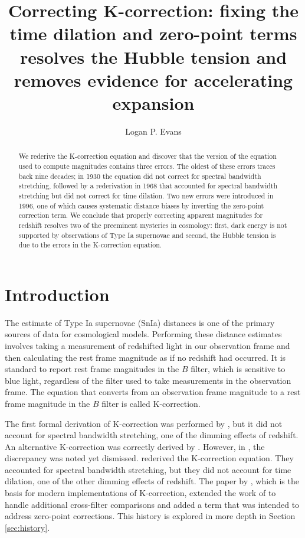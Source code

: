 \documentclass[linenumbers]{aastex631}
\begin{document}
\title{Correcting K-correction: fixing the time dilation and zero-point terms resolves the Hubble tension and removes evidence for accelerating expansion}


\author[0000-0001-6450-3262]{Logan P. Evans}

\begin{abstract}
We rederive the K-correction equation and discover that the version of the
equation used to compute magnitudes contains three errors. The oldest of these
errors traces back nine decades; in 1930 the equation did not correct for
spectral bandwidth stretching, followed by a rederivation in 1968 that
accounted for spectral bandwidth stretching but did not correct for time
dilation. Two new errors were introduced in 1996, one of which causes
systematic distance biases by inverting the zero-point correction term. We
conclude that properly correcting apparent magnitudes for redshift resolves two
of the preeminent mysteries in cosmology: first, dark energy is not supported
by observations of Type Ia supernovae and second, the Hubble tension is due to
the errors in the K-correction equation.
\end{abstract}


\section{Introduction}

The estimate of Type Ia supernovae (SnIa) distances is one of the primary
sources of data for cosmological models. Performing these distance estimates
involves taking a measurement of redshifted light in our observation frame and
then calculating the rest frame magnitude as if no redshift had occurred. It is
standard to report rest frame magnitudes in the $B$ filter, which is sensitive to
blue light, regardless of the filter used to take measurements in the
observation frame. The equation that converts from an observation frame
magnitude to a rest frame magnitude in the $B$ filter is called K-correction.

The first formal derivation of K-correction was performed by
\citet{tolman1930}, but it did not account for spectral bandwidth stretching,
one of the dimming effects of redshift. An alternative K-correction was
correctly derived by \citet{desitter1934}. However, in \citet{hubble1935}, the
discrepancy was noted yet dismissed. \citet{oke1968} rederived the K-correction
equation.  They accounted for spectral bandwidth stretching, but they did not
account for time dilation, one of the other dimming effects of redshift. The
paper by \citet{kim1996}, which is the basis for modern implementations of
K-correction, extended the work of \citet{oke1968} to handle additional
cross-filter comparisons and added a term that was intended to address
zero-point corrections. This history is explored in more depth in Section
\ref{sec:history}.
\end{document}
